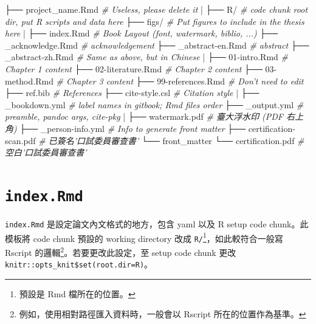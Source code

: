 \documentclass[oneside]{book}
\newenvironment{Shaded}{\begin{snugshade}}{\end{snugshade}}
\newcommand{\CommentTok}[1]{\textcolor[rgb]{0.56,0.35,0.01}{\textit{#1}}}
\newcommand{\NormalTok}[1]{#1}
\newcommand{\StringTok}[1]{\textcolor[rgb]{0.31,0.60,0.02}{#1}}
\begin{document}
\begin{Shaded}
\begin{Highlighting}[]
\NormalTok{├── project_name.Rmd     }\CommentTok{# Useless, please delete it}
\StringTok{|}
\NormalTok{├── R/                   }\CommentTok{# code chunk root dir, put R scripts and data here}
\NormalTok{├── figs/                }\CommentTok{# Put figures to include in the thesis here}
\StringTok{|}
\NormalTok{├── index.Rmd            }\CommentTok{# Book Layout (font, watermark, biblio, ...)}
\NormalTok{├── _acknowledge.Rmd     }\CommentTok{# acknowledgement}
\NormalTok{├── _abstract-en.Rmd     }\CommentTok{# abstract}
\NormalTok{├── _abstract-zh.Rmd     }\CommentTok{# Same as above, but in Chinese}
\StringTok{|}
\NormalTok{├── 01-intro.Rmd         }\CommentTok{# Chapter 1 content}
\NormalTok{├── 02-literature.Rmd    }\CommentTok{# Chapter 2 content}
\NormalTok{├── 03-method.Rmd        }\CommentTok{# Chapter 3 content}
\NormalTok{├── 99-references.Rmd    }\CommentTok{# Don't need to edit}
\NormalTok{├── ref.bib              }\CommentTok{# References}
\NormalTok{├── cite-style.csl       }\CommentTok{# Citation style}
\StringTok{|}
\NormalTok{├── _bookdown.yml        }\CommentTok{# label names in gitbook; Rmd files order}
\NormalTok{├── _output.yml          }\CommentTok{# preamble, pandoc args, cite-pkg}
\StringTok{|}
\NormalTok{├── watermark.pdf        }\CommentTok{# 臺大浮水印 (PDF 右上角)}
\NormalTok{├── _person-info.yml      }\CommentTok{# Info to generate front matter}
\NormalTok{├── certification-scan.pdf  }\CommentTok{# 已簽名'口試委員審查書'}
\NormalTok{└── front_matter}
\NormalTok{    └── certification.pdf   }\CommentTok{# 空白'口試委員審查書'}
\end{Highlighting}
\end{Shaded}

\hypertarget{index-rmd}{%
\section{\texorpdfstring{\texttt{index.Rmd}}{index.Rmd}}\label{index-rmd}}

\texttt{index.Rmd} 是設定論文內文格式的地方，包含 yaml 以及 R setup code chunk。此模板將 code chunk 預設的 working directory 改成 \texttt{R/}\footnote{預設是 Rmd 檔所在的位置。}，如此較符合一般寫 Rscript 的邏輯\footnote{例如，使用相對路徑匯入資料時，一般會以 Rscript 所在的位置作為基準。}。若要更改此設定，至 setup code chunk 更改 \texttt{knitr::opts\_knit\$set(root.dir=\textquotesingle{}R\textquotesingle{})}。
\end{document}
